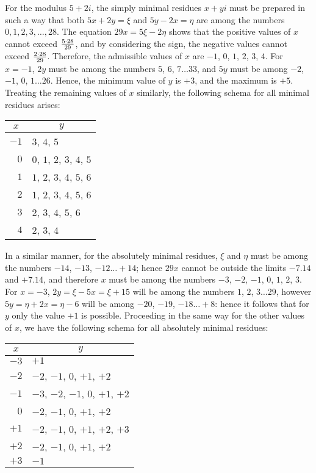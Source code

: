 \documentclass[twoside,12pt]{memoir}
\let\oldfrac\frac
\def\frac#1#2{\mathchoice{\tfrac{#1}{#2}}{\oldfrac{#1}{#2}}{\genfrac{}{}{}{2}{#1}{#2\mathstrut}}{\genfrac{}{}{}{3}{#1}{#2\mathstrut}}}
\begin{document}
For the modulus \(5+2i\), the simply minimal residues \(x+yi\) must be prepared in such a way that both \(5x+2y=\xi\) and \(5y-2x=\eta\) are among the numbers \(0, 1, 2, 3, \ldots, 28\). The equation \(29x=5\xi-2\eta\) shows that the positive values of \(x\) cannot exceed \(\frac{5 \cdot 28}{29}\), and by considering the sign, the negative values cannot exceed \(\frac{2 \cdot 28}{29}\). Therefore, the admissible values of \(x\) are \(-1\), \(0\), \(1\), \(2\), \(3\), \(4\). For \(x=-1\), \(2y\) must be among the numbers \(5\), \(6\), \(7 \ldots 33\), and \(5y\) must be among \(-2\), \(-1\), \(0\), \(1 \ldots 26\). Hence, the minimum value of \(y\) is \(+3\), and the maximum is \(+5\). Treating the remaining values of \(x\) similarly, the following schema for all minimal residues arises:\pagebreak%
\begin{center}
\begin{tabular}{r|l}
\multicolumn{1}{c|}{\(x\)} & \multicolumn{1}{c}{\(y\)} \\
\hline
\(-1\) & \(3\), \(4\), \(5\) \\
\(0\) & \(0\), \(1\), \(2\), \(3\), \(4\), \(5\) \\
\(1\) & \(1\), \(2\), \(3\), \(4\), \(5\), \(6\) \\
\(2\) & \(1\), \(2\), \(3\), \(4\), \(5\), \(6\) \\
\(3\) & \(2\), \(3\), \(4\), \(5\), \(6\) \\
\(4\) & \(2\), \(3\), \(4\) \\
\end{tabular}
\end{center}

In a similar manner, for the absolutely minimal residues, \(\xi\) and \(\eta\) must be among the numbers \(-14\), \(-13\), \(-12 \ldots+14\); hence \(29 x\) cannot be outside the limits \(-7.14\) and \(+7.14\), and therefore \(x\) must be among the numbers \(-3\), \(-2\), \(-1\), \(0\), \(1\), \(2\), \(3\). For \(x=-3\), \(2 y=\xi-5 x=\xi+15\) will be among the numbers \(1\), \(2\), \(3 \ldots 29\), however \(5 y=\eta+2 x=\eta-6\) will be among \(-20\), \(-19\), \(-18 \ldots+8\): hence it follows that for \(y\) only the value \(+1\) is possible. Proceeding in the same way for the other values of \(x\), we have the following schema for all absolutely minimal residues:
\begin{center}
\begin{tabular}{r|l}
\multicolumn{1}{c|}{\(x\)} & \multicolumn{1}{c}{\(y\)} \\
\hline
\(-3\) & \(+1\) \\
\(-2\) & \(-2\), \(-1\), \(0\), \(+1\), \(+2\) \\
\(-1\) & \(-3\), \(-2\), \(-1\), \(0\), \(+1\), \(+2\) \\
\(0\) & \(-2\), \(-1\), \(0\), \(+1\), \(+2\) \\
\(+1\) & \(-2\), \(-1\), \(0\), \(+1\), \(+2\), \(+3\) \\
\(+2\) & \(-2\), \(-1\), \(0\), \(+1\), \(+2\) \\
\(+3\) & \(-1\) \\
\end{tabular}
\end{center}
\end{document}
